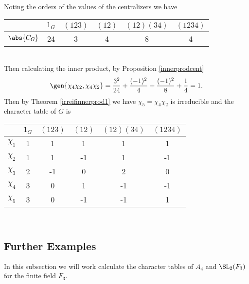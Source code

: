\documentclass[../Project.tex]{subfiles}
\begin{document}
\begin{exam}
Noting the orders of the values of the centralizers we have\\

\begin{minipage}{\linewidth}
\centering
	\begin{tabular}{c | c  c  c  c  c}
		  $ $ & $1_{G}$ & $(123)$ & $(12)$ & $(12)(34)$ & $(1234)$\\
	\hline
		$\abs{C_{G}}$ & 24 & 3 & 4 & 8 & 4\\
	\hline
	\end{tabular}
	\end{minipage}\\

Then calculating the inner product, by Proposition \ref{innerprodcent}
$$\gen{\chi_4\chi_2,\chi_4\chi_2} = \frac{3^2}{24} + \frac{(-1)^2}{4} + \frac{(-1)^2}{8} + \frac{1}{4} = 1.$$
Then by Theorem \ref{irreifinnerprod1} we have $\chi_5 = \chi_4\chi_2$ is irreducible and the character table of $G$ is\\

	\begin{minipage}{\linewidth}
\centering
	\begin{tabular}{c | c  c  c  c  c}
		  $ $ & $1_{G}$ & $(123)$ & $(12)$ & $(12)(34)$ & $(1234)$\\
	\hline
		$\chi_1$ & 1 & 1 & 1 & 1 & 1\\
		$\chi_2$ & 1 & 1 & -1 & 1 & -1\\
		$\chi_3$ & 2 & -1 & 0 & 2 & 0\\
		$\chi_4$ & 3 & 0 & 1 & -1 & -1\\
		$\chi_5 $ & 3 & 0 & -1 & -1 & 1\\
	\hline
	\end{tabular}
	\end{minipage}\\
\end{exam}


\newpage
\subsection{Further Examples}
In this subsection we will work calculate the character tables of $A_4$ and $\SL_2(F_3)$ for the finite field $F_3$.
\end{document}
